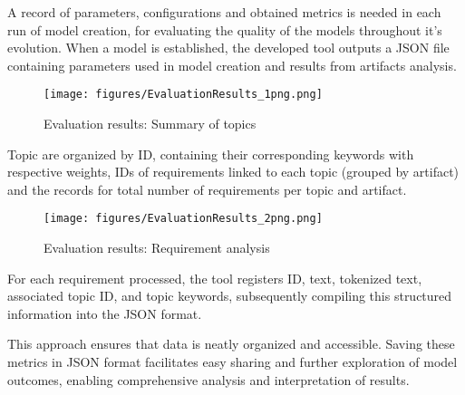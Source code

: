 A record of parameters, configurations and obtained metrics is needed in each run of model creation, for evaluating the quality of the models throughout it's evolution. When a  model is established, the developed tool outputs a JSON file containing parameters used in model creation and results from artifacts analysis.

\begin{figure}[h]
    \centering
    \texttt{[image: figures/EvaluationResults\_1png.png]}
    \caption{Evaluation results: Summary of topics}
    \label{fig:EvaluationResults_1png}
\end{figure}

Topic are organized by ID, containing their corresponding keywords with respective weights, IDs of requirements linked to each topic (grouped by artifact) and the records for total number of requirements per topic and artifact. 

\begin{figure}[h]
    \centering
    \texttt{[image: figures/EvaluationResults\_2png.png]}
    \caption{Evaluation results: Requirement analysis}
    \label{fig:EvaluationResults_2png}
\end{figure}

For each requirement processed, the tool registers ID, text, tokenized text, associated topic ID, and topic keywords, subsequently compiling this structured information into the JSON format. 

This approach ensures that data is neatly organized and accessible. Saving these metrics in JSON format facilitates easy sharing and further exploration of model outcomes, enabling comprehensive analysis and interpretation of results.


